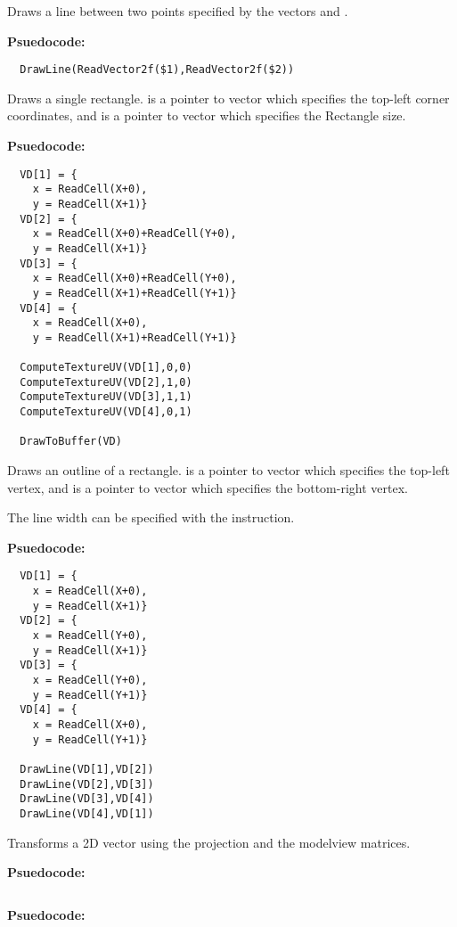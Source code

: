 Draws a line between two points specified by the vectors  and .

\textbf{Psuedocode:}
\begin{verbatim}
  DrawLine(ReadVector2f($1),ReadVector2f($2))
\end{verbatim}


Draws a single rectangle.  is a pointer to vector which specifies the top-left corner coordinates, and  is a pointer to vector which specifies the Rectangle size.

\textbf{Psuedocode:}
\begin{verbatim}
  VD[1] = {
    x = ReadCell(X+0),
    y = ReadCell(X+1)}
  VD[2] = {
    x = ReadCell(X+0)+ReadCell(Y+0),
    y = ReadCell(X+1)}
  VD[3] = {
    x = ReadCell(X+0)+ReadCell(Y+0),
    y = ReadCell(X+1)+ReadCell(Y+1)}
  VD[4] = {
    x = ReadCell(X+0),
    y = ReadCell(X+1)+ReadCell(Y+1)}
  
  ComputeTextureUV(VD[1],0,0)
  ComputeTextureUV(VD[2],1,0)
  ComputeTextureUV(VD[3],1,1)
  ComputeTextureUV(VD[4],0,1)

  DrawToBuffer(VD)
\end{verbatim}


Draws an outline of a rectangle.  is a pointer to vector which specifies the top-left vertex, and  is a pointer to vector which specifies the bottom-right vertex.

The line width can be specified with the  instruction.

\textbf{Psuedocode:}
\begin{verbatim}
  VD[1] = {
    x = ReadCell(X+0),
    y = ReadCell(X+1)}
  VD[2] = {
    x = ReadCell(Y+0),
    y = ReadCell(X+1)}
  VD[3] = {
    x = ReadCell(Y+0),
    y = ReadCell(Y+1)}
  VD[4] = {
    x = ReadCell(X+0),
    y = ReadCell(Y+1)}

  DrawLine(VD[1],VD[2])
  DrawLine(VD[2],VD[3])
  DrawLine(VD[3],VD[4])
  DrawLine(VD[4],VD[1])
\end{verbatim}


Transforms a 2D vector using the projection and the modelview matrices.

\textbf{Psuedocode:}
\begin{verbatim}
\end{verbatim}



\textbf{Psuedocode:}
\begin{verbatim}
\end{verbatim}


